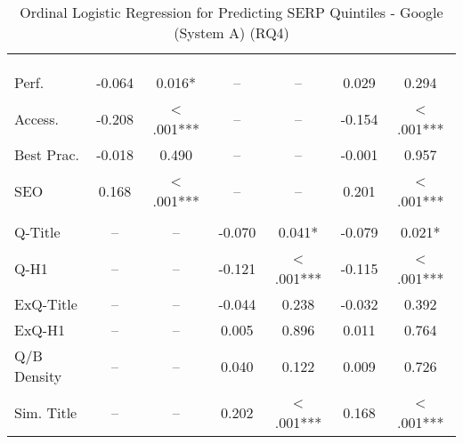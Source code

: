 \begin{table}[htbp!] 
\centering
\caption{Ordinal Logistic Regression for Predicting SERP Quintiles - Google (System A) (RQ4)}
\label{app:rq4_regression_google}
\small 
\setlength{\tabcolsep}{3pt}
\renewcommand{\arraystretch}{1}
\begin{threeparttable}
\begin{tabular*}{\textwidth}{l@{\extracolsep{\fill}} S[table-format=-1.3,table-space-text-post={***}] S[table-format=1.3,table-comparator=true,table-space-text-post={***}] S[table-format=-1.3,table-space-text-post={***}] S[table-format=1.3,table-comparator=true,table-space-text-post={***}] S[table-format=-1.3,table-space-text-post={***}] S[table-format=1.3,table-comparator=true,table-space-text-post={***}]}
\toprule
&  &  &  \\
\cmidrule(lr){2-3} \cmidrule(lr){4-5} \cmidrule(lr){6-7}
 & {} & {} & {} & {} & {} & {} \\
\dmidrule
{} & & & & & & \\
Perf. & -0.064 & 0.016* &  &  & 0.029 & 0.294 \\
Access. & -0.208 & < .001*** &  &  & -0.154 & < .001*** \\
Best Prac. & -0.018 & 0.490 &  &  & -0.001 & 0.957 \\
SEO & 0.168 & < .001*** &  &  & 0.201 & < .001*** \\
\midrule
{} & & & & & & \\
Q-Title &  &  & -0.070 & 0.041* & -0.079 & 0.021* \\
Q-H1 &  &  & -0.121 & < .001*** & -0.115 & < .001*** \\
ExQ-Title &  &  & -0.044 & 0.238 & -0.032 & 0.392 \\
ExQ-H1 &  &  & 0.005 & 0.896 & 0.011 & 0.764 \\
Q/B Density &  &  & 0.040 & 0.122 & 0.009 & 0.726 \\
Sim. Title &  &  & 0.202 & < .001*** & 0.168 & < .001*** \\

\end{tabular*}
\end{threeparttable}
\end{table}

